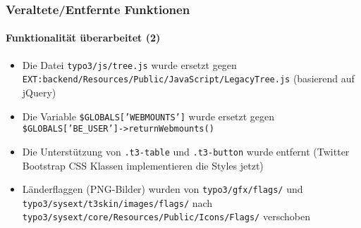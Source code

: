 \begin{frame}[fragile]
	\frametitle{Veraltete/Entfernte Funktionen}
	\framesubtitle{Funktionalität überarbeitet (2)}

	\begin{itemize}

		\item Die Datei
			\small\texttt{typo3/js/tree.js}\normalsize\space
			wurde ersetzt gegen
			\small\texttt{EXT:backend/Resources/Public/JavaScript/LegacyTree.js}\normalsize\newline
			(basierend auf jQuery)

		\item Die Variable
			\small\texttt{\$GLOBALS['WEBMOUNTS']}\normalsize\space
			wurde ersetzt gegen
			\small\texttt{\$GLOBALS['BE\_USER']->returnWebmounts()}\normalsize

		\item Die Unterstützung von
			\small\texttt{.t3-table}\normalsize\space
			und
			\small\texttt{.t3-button}\normalsize\space
			wurde entfernt\newline
			\small
				(Twitter Bootstrap CSS Klassen implementieren die Styles jetzt)
			\normalsize

		\item Länderflaggen (PNG-Bilder) wurden von
			\small\texttt{typo3/gfx/flags/}\normalsize\space
			und
			\small\texttt{typo3/sysext/t3skin/images/flags/}\normalsize\space
			nach
			\small\texttt{typo3/sysext/core/Resources/Public/Icons/Flags/}\normalsize\space
			verschoben

	\end{itemize}

\end{frame}


